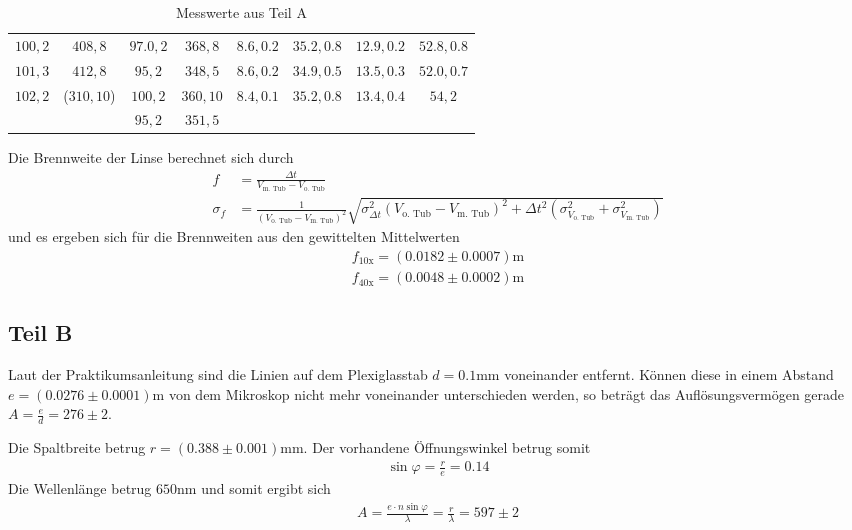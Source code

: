 \documentclass[12pt,a4paper,titlepage,headinclude,bibtotoc]{scrartcl}
\begin{document}
\begin{table}
\centering
\begin{tabular}{|c|c|c|c|c|c|c|c|}

$ 100, 2 $	&$408,8$	&$ 97.0, 2 $	&$ 368, 8 $	&$ 8.6, 0.2 $	&$ 35.2, 0.8 $	&$ 12.9, 0.2 $	&$ 52.8, 0.8 $	\\
$ 101, 3 $	&$412,8$	&$ 95, 2 $	&$ 348, 5 $	&$ 8.6, 0.2 $	&$ 34.9, 0.5 $	&$ 13.5, 0.3 $	&$ 52.0, 0.7 $	\\
$ 102, 2 $	&($310,10$)	&$ 100, 2 $	&$ 360, 10 $	&$ 8.4, 0.1 $	&$ 35.2, 0.8 $	&$ 13.4, 0.4 $	&$ 54, 2 $	\\
		&	&$ 95, 2 $	&$ 351, 5 $	&		&		&		&		\\



\end{tabular}
\caption{Messwerte aus Teil A}
\label{tab:MesswerteA}
\end{table}

Die Brennweite der Linse berechnet sich durch
\begin{align}
f&=\frac{\Delta t}{V_\text{m. Tub} - V_\text{o. Tub}}\\
\sigma_f&=\frac{1}{\left(V_\text{o. Tub} - V_\text{m. Tub}\right)^{2}} \sqrt{\sigma_{\Delta t}^{2} \left(V_\text{o. Tub} - V_\text{m. Tub}\right)^{2} + \Delta t^{2} \left(\sigma_{V_\text{o. Tub}}^{2} + \sigma_{V_\text{m. Tub}}^{2}\right)}
\end{align}
und es ergeben sich für die Brennweiten aus den gewittelten Mittelwerten
\begin{align}
f_\text{10x}=(0.0182 \pm 0.0007)\si\metre\\
f_\text{40x}=(0.0048 \pm 0.0002)\si\metre
\end{align}

\subsection{Teil B}
Laut der Praktikumsanleitung sind die Linien auf dem Plexiglasstab $d=0.1\si{\milli\metre}$ voneinander entfernt.
Können diese in einem Abstand $e=(0.0276\pm0.0001)\si{\metre}$ von dem Mikroskop nicht mehr voneinander unterschieden werden, so beträgt das Auflösungsvermögen gerade $A=\frac{e}{d}=276\pm2$.

Die Spaltbreite betrug $r=(0.388\pm0.001)\si{\milli\metre}$.
Der vorhandene Öffnungswinkel betrug somit
\begin{align*}
\sin\varphi=\frac{r}{e}=0.14
\end{align*}
Die Wellenlänge betrug $650\si{\nano\metre}$ und somit ergibt sich
\begin{align*}
A=\frac{e\cdot n\sin\varphi}{\lambda}=\frac{r}{\lambda}=597 \pm 2
\end{align*}
\end{document}
